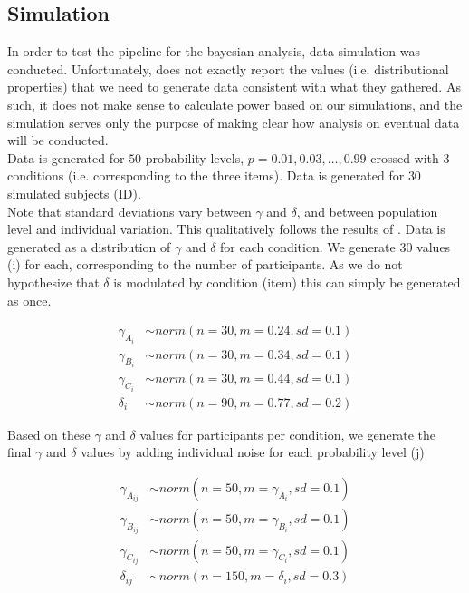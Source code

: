 \documentclass[12pt]{article}
\begin{document}
\subsection{Simulation}
In order to test the pipeline for the
bayesian analysis, data simulation was
conducted. Unfortunately, \textcite{gonzalez1999shape}
does not exactly report the values (i.e.
distributional properties) that we need
to generate data consistent with what they
gathered. As such, it does not make sense
to calculate power based on our simulations,
and the simulation serves only the purpose
of making clear how analysis on eventual data
will be conducted. \\

Data is generated for $50$ probability levels,
$p = 0.01, 0.03,  \ldots, 0.99$ crossed with $3$
conditions (i.e. corresponding to the three items).
Data is generated for $30$ simulated subjects (ID). \\

Note that standard deviations vary
between $\gamma$ and $\delta$, and
between population level and individual
variation. This qualitatively
follows the results of \textcite{gonzalez1999shape}.
Data is generated as a distribution of $\gamma$
and $\delta$ for each condition. We generate
$30$ values (i) for each, corresponding to the
number of participants. As we do not hypothesize
that $\delta$ is modulated by condition (item)
this can simply be generated as once.


\begin{equation} \label{eq1}
\begin{split}
	\gamma_{A_{i}} &\sim norm(n = 30,
	m = 0.24, sd = 0.1) \\
	\gamma_{B_{i}} &\sim norm(n = 30,
	m = 0.34, sd = 0.1) \\
	\gamma_{C_{i}} &\sim norm(n = 30,
	m = 0.44, sd = 0.1) \\
	\delta_i &\sim norm(n = 90,
	m = 0.77, sd = 0.2)
\end{split}
\end{equation}

Based on these $\gamma$ and $\delta$ values for
participants per condition, we generate
the final $\gamma$ and $\delta$ values by
adding individual noise for each probability
level (j)

\begin{equation} \label{eq2}
\begin{split}
	\gamma_{A_{ij}} &\sim norm(n = 50,
	m = \gamma_{A_{i}}, sd = 0.1) \\
	\gamma_{B_{ij}} &\sim norm(n = 50,
	m = \gamma_{B_{i}}, sd = 0.1) \\
	\gamma_{C_{ij}} &\sim norm(n = 50,
	m = \gamma_{C_{i}}, sd = 0.1) \\
	\delta_{ij} &\sim norm(n = 150,
	m = \delta_{i}, sd = 0.3)
\end{split}
\end{equation}
\end{document}
